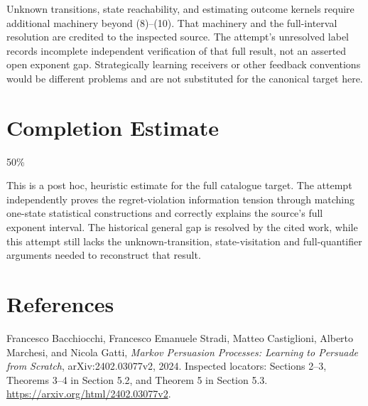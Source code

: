 \documentclass[11pt]{article}
\begin{document}
Unknown transitions, state reachability, and estimating outcome kernels
require additional machinery beyond (8)--(10). That machinery and the
full-interval resolution are credited to the inspected source. The
attempt's unresolved label records incomplete independent verification
of that full result, not an asserted open exponent gap. Strategically
learning receivers or other feedback conventions would be different
problems and are not substituted for the canonical target here.

\section{Completion Estimate}
50\%

This is a post hoc, heuristic estimate for the full catalogue target.
The attempt independently proves the regret-violation information tension through matching one-state statistical constructions and correctly explains the source's full exponent interval. The historical general gap is resolved by the cited work, while this attempt still lacks the unknown-transition, state-visitation and full-quantifier arguments needed to reconstruct that result.

\section*{References}
Francesco Bacchiocchi, Francesco Emanuele Stradi, Matteo Castiglioni,
Alberto Marchesi, and Nicola Gatti, \emph{Markov Persuasion Processes:
Learning to Persuade from Scratch}, arXiv:2402.03077v2, 2024.
Inspected locators: Sections 2--3, Theorems 3--4 in Section 5.2,
and Theorem 5 in Section 5.3.
\url{https://arxiv.org/html/2402.03077v2}.
\end{document}
